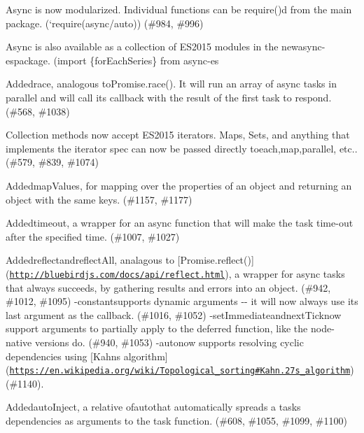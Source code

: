 \begin{DoxyItemize}
\item Async is now modularized. Individual functions can be {\ttfamily require()}d from the main package. (`require(\textquotesingle{}async/auto\textquotesingle{}){\ttfamily ) (\#984, \#996)}
\item {\ttfamily Async is also available as a collection of E\+S2015 modules in the new}async-\/es{\ttfamily package. (}import \{for\+Each\+Series\} from \textquotesingle{}async-\/es
\item {\ttfamily Added}race{\ttfamily , analogous to}Promise.\+race(){\ttfamily . It will run an array of async tasks in parallel and will call its callback with the result of the first task to respond. (\#568, \#1038)}
\item {\ttfamily Collection methods now accept E\+S2015 iterators. Maps, Sets, and anything that implements the iterator spec can now be passed directly to}each{\ttfamily ,}map{\ttfamily ,}parallel{\ttfamily , etc.. (\#579, \#839, \#1074)}
\item {\ttfamily Added}map\+Values{\ttfamily , for mapping over the properties of an object and returning an object with the same keys. (\#1157, \#1177)}
\item {\ttfamily Added}timeout{\ttfamily , a wrapper for an async function that will make the task time-\/out after the specified time. (\#1007, \#1027)}
\item {\ttfamily Added}reflect{\ttfamily and}reflect\+All{\ttfamily , analagous to \mbox{[}}Promise.\+reflect(){\ttfamily \mbox{]}(\href{http://bluebirdjs.com/docs/api/reflect.html}{\tt http\+://bluebirdjs.\+com/docs/api/reflect.\+html}), a wrapper for async tasks that always succeeds, by gathering results and errors into an object. (\#942, \#1012, \#1095) -\/}constant{\ttfamily supports dynamic arguments -\/-\/ it will now always use its last argument as the callback. (\#1016, \#1052) -\/}set\+Immediate{\ttfamily and}next\+Tick{\ttfamily now support arguments to partially apply to the deferred function, like the node-\/native versions do. (\#940, \#1053) -\/}auto{\ttfamily now supports resolving cyclic dependencies using \mbox{[}Kahn\textquotesingle{}s algorithm\mbox{]}(\href{https://en.wikipedia.org/wiki/Topological_sorting#Kahn.27s_algorithm}{\tt https\+://en.\+wikipedia.\+org/wiki/\+Topological\+\_\+sorting\#\+Kahn.\+27s\+\_\+algorithm}) (\#1140).}
\item {\ttfamily Added}auto\+Inject{\ttfamily , a relative of}auto{\ttfamily that automatically spreads a task\textquotesingle{}s dependencies as arguments to the task function. (\#608, \#1055, \#1099, \#1100)}

\end{DoxyItemize}
